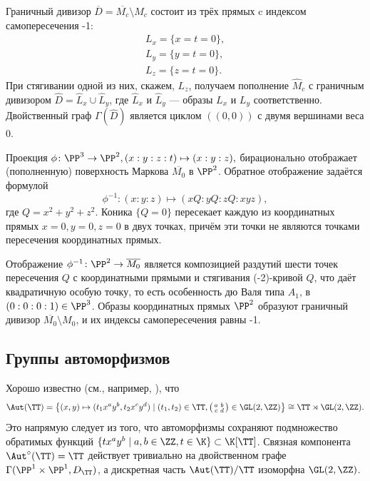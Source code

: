 Граничный дивизор $\overline{D}=\overline{M_c}\setminus M_c$ состоит из трёх прямых c индексом самопересечения -1:
\begin{align*}
    L_x=\{x=t=0\},\\
    L_y=\{y=t=0\},\\
    L_z=\{z=t=0\}.
\end{align*}
При стягивании одной из них, скажем, $L_z$, получаем пополнение $\hat M_c$ с граничным дивизором $\hat D=\hat L_x\cup\hat L_y$, где $\hat L_x$ и $\hat L_y$ --- образы $L_x$ и $L_y$ соответственно. Двойственный граф $\Gamma(\hat D)$ является циклом $((0,0))$ с двумя вершинами веса 0.

\begin{remark}
Проекция $\phi\colon \PP^3\to\PP^2,(x:y:z:t)\mapsto(x:y:z),$ бирационально отображает (пополненную) поверхность Маркова $\overline{M_0}$ в $\PP^2$. Обратное отображение задаётся формулой \[\phi^{-1}:(x:y:z)\mapsto(xQ:yQ:zQ:xyz),\] где $Q=x^2+y^2+z^2$.
Коника $\{Q=0\}$ пересекает каждую из координатных прямых $x=0, y=0, z=0$ в двух точках, причём эти точки не являются точками пересечения координатных прямых.

Отображение $\phi^{-1}\colon \PP^2\to \overline{M_0}$ является композицией раздутий шести точек пересечения $Q$ с координатными прямыми и стягивания (-2)-кривой $Q$, что даёт квадратичную особую точку, то есть особенность дю Валя типа $A_1$, в $(0:0:0:1)\in\PP^3$. Образы координатных прямых $\PP^2$ образуют граничный дивизор $\overline{M_0}\setminus M_0$, и их индексы самопересечения равны -1. 
\end{remark}



\subsection{Группы автоморфизмов}
Хорошо известно (см., например, \cite[Example 1]{ArGa17}), что
\[\Aut(\TT) = \left\{(x,y)\mapsto (t_1x^ay^b,t_2x^cy^d)\mid (t_1,t_2)\in \TT, \left(\begin{smallmatrix}a&b\\c&d\end{smallmatrix}\right)\in\GL(2,\ZZ)\right\}\cong \TT\rtimes \GL(2,\ZZ).\]
Это напрямую следует из того, что автоморфизмы сохраняют подмножество обратимых функций $\{tx^ay^b\mid a,b\in\ZZ,t\in\K\}\subset \K[\TT]$. %
Связная компонента $\Aut^\circ(\TT)=\TT$ действует тривиально на двойственном графе $\Gamma(\PP^1\times\PP^1,D_\TT)$, а дискретная часть $\Aut(\TT)/\TT$ изоморфна $\GL(2,\ZZ)$. 

